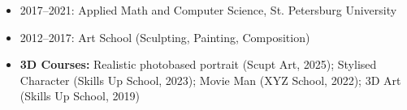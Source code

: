 \documentclass[10pt,a4paper]{altacv}
\begin{document}
\begin{fullwidth}
\begin{itemize}
\item 2017–2021: Applied Math and Computer Science, St. Petersburg University  
\item 2012–2017: Art School (Sculpting, Painting, Composition)  
\item \textbf{3D Courses:} Realistic photobased portrait (Scupt Art, 2025); Stylised Character (Skills Up School, 2023); Movie Man (XYZ School, 2022); 3D Art (Skills Up School, 2019)  
\end{itemize}

\end{fullwidth}
\end{document}
